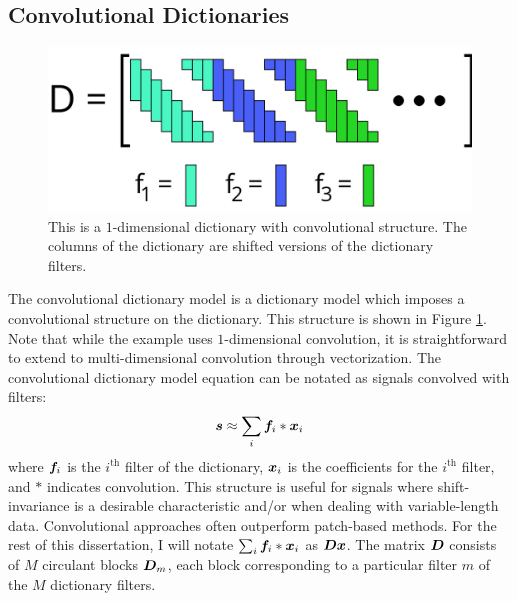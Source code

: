\subsection{Convolutional Dictionaries}
\begin{figure}
	\includegraphics[width=\textwidth]{figures/convolutionalDictionary.png}
	\caption{This is a $1$-dimensional dictionary with convolutional structure. The columns of the dictionary are shifted versions of the dictionary filters.}
	\label{Figure: Convolutional Dictionary}
\end{figure}
The convolutional dictionary model is a dictionary model which imposes a convolutional structure on the dictionary. This structure is shown in Figure \ref{Figure: Convolutional Dictionary}. Note that while the example uses $1$-dimensional convolution, it is straightforward to extend to multi-dimensional convolution through vectorization. The convolutional dictionary model equation can be notated as signals convolved with filters:
%
\begin{equation}
\bm{s} \approx \sum_i \bm{f}_i * \bm{x}_i
\end{equation}
%
where $\bm{f}_i$ is the $i^{\text{th}}$ filter of the dictionary, $\bm{x}_i$ is the coefficients for the $i^{\text{th}}$ filter, and $*$ indicates convolution. This structure is useful for signals where shift-invariance is a desirable characteristic and/or when dealing with variable-length data. Convolutional approaches often outperform patch-based methods. For the rest of this dissertation, I will notate $\sum_i \bm{f}_i * \bm{x}_i$ as $\bm{D}\bm{x}$. The matrix $\bm{D}$ consists of $M$ circulant blocks $\bm{D}_{m}$, each block corresponding to a particular filter $m$ of the $M$ dictionary filters.

